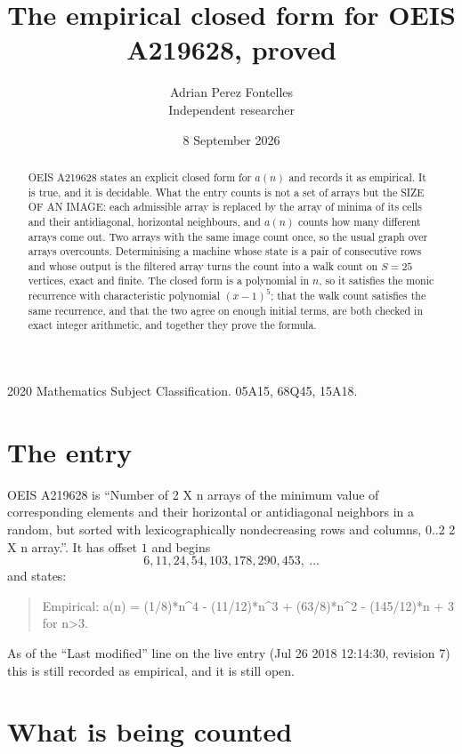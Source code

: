 \documentclass[11pt,a4paper]{article}
\title{The empirical closed form for OEIS A219628, proved}
\author{Adrian Perez Fontelles\\ \small Independent researcher}
\date{8 September 2026}
\theoremstyle{plain}
\theoremstyle{definition}
\begin{document}
\maketitle

\begin{abstract}
OEIS A219628 states an explicit closed form for $a(n)$ and records it as empirical. It is true, and
it is decidable. What the entry counts is not a set of arrays but the SIZE OF AN IMAGE: each
admissible array is replaced by the array of minima of its cells and their antidiagonal, horizontal neighbours,
and $a(n)$ counts how many different arrays come out. Two arrays with the same image count
once, so the usual graph over arrays overcounts. Determinising a machine whose state is a pair
of consecutive rows and whose output is the filtered array turns the count into a walk count on
$S=25$ vertices, exact and finite. The closed form is a polynomial in $n$, so it satisfies the
monic recurrence with characteristic polynomial $(x-1)^{5}$; that the walk count
satisfies the same recurrence, and that the two agree on enough initial terms, are both checked
in exact integer arithmetic, and together they prove the formula.
\end{abstract}

\noindent\small 2020 Mathematics Subject Classification. 05A15, 68Q45, 15A18.\normalsize

\section{The entry}

OEIS A219628 is ``Number of 2 X n arrays of the minimum value of corresponding elements and their horizontal or antidiagonal neighbors in a random, but sorted with lexicographically nondecreasing rows and columns, 0..2 2 X n array.''. It has offset $1$ and begins
\[
6, 11, 24, 54, 103, 178, 290, 453,\ \dots
\]
and states:
\begin{quote}
Empirical: a(n) = (1/8)*n\^{}4 - (11/12)*n\^{}3 + (63/8)*n\^{}2 - (145/12)*n + 3 for n>3.
\end{quote}
As of the ``Last modified'' line on the live entry (Jul 26 2018 12:14:30, revision 7)
this is still recorded as empirical, and it is still open.

\section{What is being counted}
\end{document}

